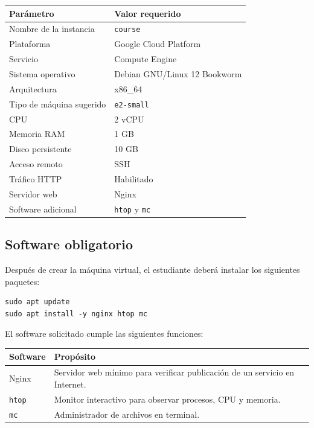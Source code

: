 \documentclass[
  coursetitle={Cómputo Nube y Tecnologías Emergentes},
  coursehours={96},
  coursedate={Verano 2026},
  doctype={Tarea 2},
  otherlangs={english,french},
  authorname={Lázaro},
  authorsurname={Bustio-Martínez},
  authortitle={PhD},
  role={Profesor Investigador},
  email={lbustio@inaoe.mx},
  phone={5559504000},
  ext={7459},
  institution={Instituto Nacional de Astrofísica, Óptica y Electrónica (INAOE)},
  department={Maestría en Ciencias en Tecnologías de Seguridad},
  address={Luis Enrique Erro 1, Sta. Ma. Tonantzintla, San Andrés Cholula, CP 72840, Puebla, México},
  margin={0.5in}
]{lbustio_lecture_notes}
\begin{document}
\begin{center}
\begin{tabular}{|p{}|p{}|}
\hline
\textbf{Parámetro} & \textbf{Valor requerido} \\
\hline
Nombre de la instancia & \texttt{course} \\
\hline
Plataforma & Google Cloud Platform \\
\hline
Servicio & Compute Engine \\
\hline
Sistema operativo & Debian GNU/Linux 12 Bookworm \\
\hline
Arquitectura & x86\_64 \\
\hline
Tipo de máquina sugerido & \texttt{e2-small} \\
\hline
CPU & 2 vCPU \\
\hline
Memoria RAM & 1 GB \\
\hline
Disco persistente & 10 GB \\
\hline
Acceso remoto & SSH \\
\hline
Tráfico HTTP & Habilitado \\
\hline
Servidor web & Nginx \\
\hline
Software adicional & \texttt{htop} y \texttt{mc} \\
\hline
\end{tabular}
\end{center}

\subsection{Software obligatorio}
\label{sec:tarea2-software}

Después de crear la máquina virtual, el estudiante deberá instalar los siguientes paquetes:

\begin{verbatim}
sudo apt update
sudo apt install -y nginx htop mc
\end{verbatim}

El software solicitado cumple las siguientes funciones:

\begin{center}
\begin{tabular}{|p{}|p{}|}
\hline
\textbf{Software} & \textbf{Propósito} \\
\hline
Nginx & Servidor web mínimo para verificar publicación de un servicio en Internet. \\
\hline
\texttt{htop} & Monitor interactivo para observar procesos, CPU y memoria. \\
\hline
\texttt{mc} & Administrador de archivos en terminal. \\
\hline
\end{tabular}
\end{center}
\end{document}
